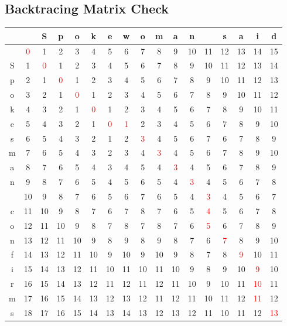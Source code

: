 \subsection{Backtracing Matrix Check}
\begin{tabular}{||c|c c c c c c c c c c c c c c c c |}
\hline
  &       &S  	&p	  &o	  &k	  &e	  &w	  &o	  &m	  &a	  &n	 &	   &s	  &a	  &i	  &d\\
\hline
\hline
&   \textcolor{red}{0} 	&1	  &2	  &3	  &4	  &5	  &6 	  &7	  &8	  &9	  &10	  &11	  &12	  &13	  &14	  &15\\
S & 	1	  &\textcolor{red}{0}	  &1	  &2	  &3	  &4	  &5	  &6	  &7	  &8	  &9	  &10	  &11	  &12	  &13	  &14\\
p & 	2	  &1	  &\textcolor{red}{0}	  &1	  &2	  &3	  &4	  &5  	&6	  &7	  &8	  &9	  &10	  &11	  &12	  &13\\
o & 	3	  &2	  &1	  &\textcolor{red}{0}	  &1	  &2	  &3	  &4	  &5	  &6	  &7	  &8	  &9	  &10	  &11	  &12\\
k & 	4	  &3	  &2	  &1	  &\textcolor{red}{0}	  &1	  &2	  &3	  &4	  &5	  &6	  &7	  &8	  &9	  &10	  &11\\
e & 	5	  &4	  &3	  &2	  &1	  &\textcolor{red}{0}	  &\textcolor{red}{1}	  &2	  &3	  &4	  &5	  &6	  &7	  &8	  &9    &10\\
s & 	6	  &5	  &4	  &3	  &2	  &1	  &2	  &\textcolor{red}{3}	  &4	  &5	  &6	  &7	  &6	  &7	  &8    &9\\
m & 	7	  &6	  &5	  &4	  &3	  &2	  &3	  &4	  &\textcolor{red}{3}	  &4	  &5	  &6	  &7	  &8	  &9	  &10\\
a & 	8	  &7	  &6	  &5	  &4	  &3	  &4	  &5	  &4	  &\textcolor{red}{3}	  &4	  &5	  &6	  &7	  &8	  &9\\
n & 	9	  &8	  &7	  &6	  &5	  &4	  &5	  &6	  &5	  &4	  &\textcolor{red}{3}	  &4	  &5	  &6	  &7	  &8\\
  &   10	&9	  &8	  &7	  &6	  &5	  &6	  &7	  &6	  &5	  &4	  &\textcolor{red}{3}	  &4	  &5	  &6	  &7\\
c & 	11	&10	  &9	  &8	  &7	  &6	  &7	  &8	  &7	  &6	  &5	  &\textcolor{red}{4}	  &5	  &6	  &7	  &8\\
o & 	12	&11	  &10	  &9	  &8	  &7	  &8	  &7	  &8	  &7	  &6	  &\textcolor{red}{5}	  &6	  &7	  &8	  &9\\
n & 	13	&12	  &11	  &10	  &9	  &8	  &9	  &8	  &9	  &8	  &7	  &6	  &\textcolor{red}{7}	  &8	  &9	  &10\\
f & 	14	&13	  &12	  &11	  &10	  &9	  &10	  &9	  &10	  &9	  &8	  &7	  &8	  &\textcolor{red}{9}	  &10	  &11\\
i & 	15	&14	  &13	  &12	  &11	  &10	  &11	  &10	  &11	  &10	  &9	  &8	  &9	  &10	  &\textcolor{red}{9}	  &10\\
r & 	16	&15	  &14	  &13	  &12	  &11	  &12	  &11	  &12	  &11	  &10	  &9	  &10	  &11	  &\textcolor{red}{10}	  &11\\
m & 	17	&16	  &15	  &14	  &13	  &12	  &13	  &12	  &11	  &12	  &11	  &10	  &11	  &12	  &\textcolor{red}{11}	  &12\\
s & 	18	&17	  &16	  &15	  &14	  &13	  &14	  &13	  &12	  &13	  &12	  &11	  &10	  &11	  &12	  &\textcolor{red}{13}\\
  \hline
\end{tabular}
